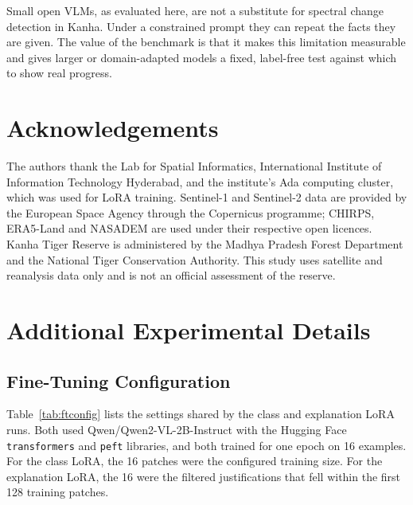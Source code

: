 \documentclass[11pt]{article}
\begin{document}
Small open VLMs, as evaluated here, are not a substitute for spectral
change detection in Kanha. Under a constrained prompt they can repeat
the facts they are given. The value of the benchmark is that it makes
this limitation measurable and gives larger or domain-adapted models a
fixed, label-free test against which to show real progress.


\section*{Acknowledgements}

The authors thank the Lab for Spatial Informatics, International
Institute of Information Technology Hyderabad, and the institute's Ada
computing cluster, which was used for LoRA training. Sentinel-1 and
Sentinel-2 data are provided by the European Space Agency through the
Copernicus programme; CHIRPS, ERA5-Land and NASADEM are used under their
respective open licences. Kanha Tiger Reserve is administered by the
Madhya Pradesh Forest Department and the National Tiger Conservation
Authority. This study uses satellite and reanalysis data only and is not
an official assessment of the reserve.





\clearpage
\appendix

\section{Additional Experimental Details}

\subsection{Fine-Tuning Configuration}

Table~\ref{tab:ftconfig} lists the settings shared by the class and
explanation LoRA runs. Both used Qwen/Qwen2-VL-2B-Instruct with the
Hugging Face \texttt{transformers} and \texttt{peft} libraries, and both
trained for one epoch on 16 examples. For the class LoRA, the 16
patches were the configured training size. For the explanation LoRA,
the 16 were the filtered justifications that fell within the first 128
training patches.
\end{document}
